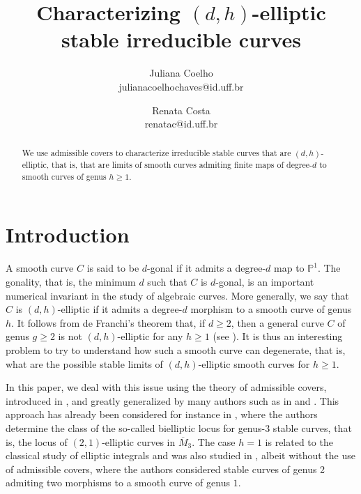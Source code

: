 \documentclass{article}
\renewcommand{\:}{\colon }
\begin{document}
\title{Characterizing $(d,h)$-elliptic stable irreducible curves}
\author{Juliana Coelho\\{\scriptsize julianacoelhochaves@id.uff.br}
\and Renata Costa\\{\scriptsize renatac@id.uff.br}
}



\maketitle


\begin{abstract}
We use admissible covers to characterize irreducible stable curves that are
 $(d,h)$-elliptic, that is, that 
are limits of smooth curves admiting finite maps of degree-$d$ to smooth curves of genus $h\geq 1$. 
\end{abstract}


\section{Introduction}



A smooth curve $C$ is said to be $d$-gonal if it admits a degree-$d$ map to $\mathbb P^1$. 
The gonality, that is, the minimum $d$ such that $C$ is $d$-gonal, is an important numerical invariant in the study of algebraic curves. 
More generally, we say that $C$ is {$(d, h)$-elliptic} if it admits a degree-$d$ morphism to a smooth curve of genus $h$.
It follows from de Franchi's theorem that, if $d\geq 2$, then a general curve $C$ of genus $g\geq 2$ is not $(d,h)$-elliptic for any $h\geq 1$ (see \cite[Corollary XXI.8.32]{3autores}). 
It is thus an interesting problem to try to understand how such a smooth curve can degenerate, that is, what are the possible stable limits of $(d,h)$-elliptic smooth curves for $h\geq 1$.


In this paper, we deal with this issue using 
the theory of admissible covers, introduced in  \cite{HarrMum}, and  greatly generalized by many authors such as in \cite{abracortivistoli} and \cite{mochizuki}. 
This approach has already been considered 
for instance in \cite{faberpaganini}, where the authors determine the class of the so-called bielliptic locus for genus-3 stable curves, that is, the locus of $(2,1)$-elliptic curves in $\overline M_3$. 
The case $h=1$ 
is related to the classical study of elliptic integrals
and was also studied in \cite{ddelliptic2018}, albeit without the use of admissible covers, where the authors considered stable curves of genus 2 admiting two morphisms to a smooth curve of genus $1$.
\end{document}
